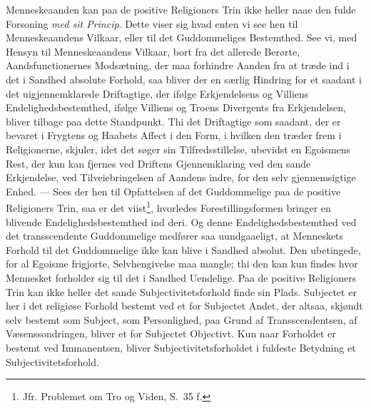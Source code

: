 Menneskeaanden kan paa de positive Religioners Trin ikke heller naae den fulde
Forsoning \emph{med sit Princip}. Dette viser sig hvad enten vi see hen til
Menneskeaandens
 \setcounter{footnote}{0}%
Vilkaar, eller til det Guddommeliges Bestemthed. See vi, med Hensyn til
Menneskeaandens Vilkaar, bort fra det allerede Berørte, Aandsfunctionernes
Modsætning, der maa forhindre Aanden fra at træde ind i det i Sandhed absolute
Forhold, saa bliver der en særlig Hindring for et saadant i det uigjennemklarede
Driftagtige, der ifølge Erkjendelsens og Villiens Endelighedsbestemthed, ifølge
Villiens og Troens Divergents fra Erkjendelsen, bliver tilbage paa dette
Standpunkt. Thi det Driftagtige som saadant, der er bevaret i Frygtens og Haabets
Affect i den Form, i hvilken den træder frem i Religionerne, skjuler, idet det
søger sin Tilfredsstillelse, ubevidst en Egoismens Rest, der kun kan fjernes ved
Driftens Gjennemklaring ved den sande Erkjendelse, ved Tilveiebringelsen af Aandens
indre, for den selv gjennemsigtige Enhed. --- Sees der hen til Opfattelsen af det
Guddommelige paa de positive Religioners Trin, saa er det viist\footnote{Jfr.
Problemet om Tro og Viden, S.\ 35 f.}, hvorledes Forestillingsformen bringer en
blivende Endelighedsbestemthed ind deri. Og denne Endelighedsbestemthed ved det
transscendente Guddommelige medfører saa uundgaaeligt, at Menneskets Forhold til
det Guddommelige ikke kan blive i Sandhed absolut. Den ubetingede, for al Egoisme
frigjorte, Selvhengivelse maa mangle; thi den kan kun findes hvor Mennesket
forholder sig til det i Sandhed Uendelige. Paa de positive Religioners Trin kan
ikke heller det sande Subjectivitetsforhold finde sin Plads. Subjectet er her i det
religiøse Forhold bestemt ved et for Subjectet Andet, der altsaa, skjøndt selv
bestemt som Subject, som Personlighed, paa Grund af Transscendentsen, af
Væsenssondringen, bliver et for Subjectet Objectivt. Kun naar Forholdet er bestemt
ved Immanentsen, bliver Subjectivitetsforholdet i fuldeste Betydning et
Subjectivitetsforhold.

